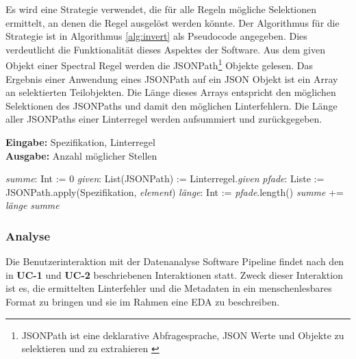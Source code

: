 Es wird eine Strategie verwendet, die für alle Regeln mögliche Selektionen ermittelt, an denen die Regel ausgelöst werden könnte. Der Algorithmus für die Strategie ist in Algorithmus \ref{alg:invert} als Pseudocode angegeben. Dies verdeutlicht die Funktionalität dieses Aspektes der Software. Aus dem given Objekt einer Spectral Regel werden die JSONPath\footnote{JSONPath ist eine deklarative Abfragesprache, \acs{JSON} Werte und Objekte zu selektieren und zu extrahieren \parencite{friesen_extracting_2019}} Objekte gelesen. Das Ergebnis einer Anwendung eines JSONPath auf ein \acs{JSON} Objekt ist ein Array an selektierten Teilobjekten. Die Länge dieses Arrays entspricht den möglichen Selektionen des JSONPaths und damit den möglichen Linterfehlern. Die Länge aller JSONPaths einer Linterregel werden aufsummiert und zurückgegeben.

\begin{algorithm}
  \caption{Ermitteln der möglichen Stellen für Linterfehler}
  \label{alg:invert}
  \textbf{Eingabe:} Spezifikation, Linterregel \\
  \textbf{Ausgabe:} Anzahl möglicher Stellen
\begin{algorithmic}[1]
    \State \textit{summe}: Int := 0
    \State \textit{given}: List(JSONPath) := Linterregel.\textit{given}
        \State \textit{pfade}: Liste := JSONPath.apply(Spezifikation, \textit{element})
        \State \textit{länge}: Int := \textit{pfade}.length()
        \State \textit{summe} += \textit{länge}
    \EndFor
    \State \Return \textit{summe}
\end{algorithmic}
\end{algorithm}


\subsubsection{Analyse} \label{sec:analyse}
Die Benutzerinteraktion mit der Datenanalyse Software Pipeline findet nach den in \textbf{UC-1} und \textbf{UC-2} beschriebenen Interaktionen statt. Zweck dieser Interaktion ist es, die ermittelten Linterfehler und die Metadaten in ein menschenlesbares Format zu bringen und sie im Rahmen eine \acf{EDA} zu beschreiben. 

